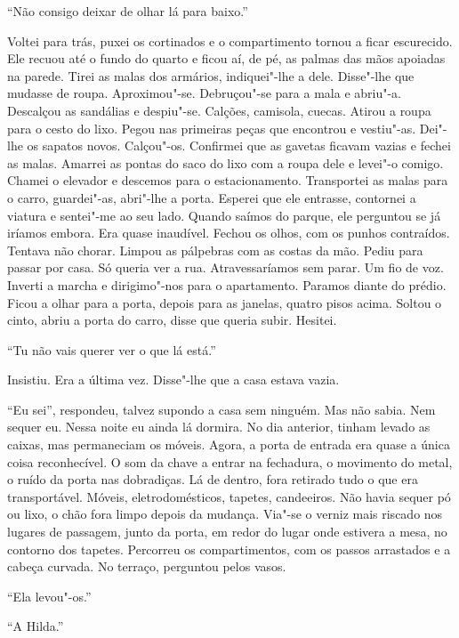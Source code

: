 ``Não consigo deixar de olhar lá para baixo.''

Voltei para trás, puxei os cortinados e o compartimento tornou a ficar
escurecido. Ele recuou até o fundo do quarto e ficou aí, de pé, as
palmas das mãos apoiadas na parede. Tirei as malas dos armários,
indiquei"-lhe a dele. Disse"-lhe que mudasse de roupa. Aproximou"-se.
Debruçou"-se para a mala e abriu"-a. Descalçou as sandálias e
despiu"-se. Calções, camisola, cuecas. Atirou a roupa para o cesto do
lixo. Pegou nas primeiras peças que encontrou e vestiu"-as. Dei"-lhe os
sapatos novos. Calçou"-os. Confirmei que as gavetas ficavam vazias e
fechei as malas. Amarrei as pontas do saco do lixo com a roupa dele e
levei"-o comigo. Chamei o elevador e descemos para o estacionamento.
Transportei as malas para o carro, guardei"-as, abri"-lhe a porta.
Esperei que ele entrasse, contornei a viatura e sentei"-me ao seu lado.
Quando saímos do parque, ele perguntou se já iríamos embora. Era quase
inaudível. Fechou os olhos, com os punhos contraídos. Tentava não
chorar. Limpou as pálpebras com as costas da mão. Pediu para passar por
casa. Só queria ver a rua. Atravessaríamos sem parar. Um fio de voz.
Inverti a marcha e dirigimo"-nos para o apartamento. Paramos diante do
prédio. Ficou a olhar para a porta, depois para as janelas, quatro pisos
acima. Soltou o cinto, abriu a porta do carro, disse que queria subir.
Hesitei.

``Tu não vais querer ver o que lá está.''

Insistiu. Era a última vez. Disse"-lhe que a casa estava vazia.

``Eu sei'',
respondeu, talvez supondo a casa sem ninguém. Mas não sabia. Nem sequer
eu. Nessa noite eu ainda lá dormira. No dia anterior, tinham levado as
caixas, mas permaneciam os móveis. Agora, a porta de entrada era quase a
única coisa reconhecível. O som da chave a entrar na fechadura, o
movimento do metal, o ruído da porta nas dobradiças. Lá de dentro, fora
retirado tudo o que era transportável. Móveis, eletrodomésticos,
tapetes, candeeiros. Não havia sequer pó ou lixo, o chão fora limpo
depois da mudança. Via"-se o verniz mais riscado nos lugares de
passagem, junto da porta, em redor do lugar onde estivera a mesa, no
contorno dos tapetes. Percorreu os compartimentos, com os passos
arrastados e a cabeça curvada. No terraço, perguntou pelos vasos.

``Ela levou"-os.''

``A Hilda.''

